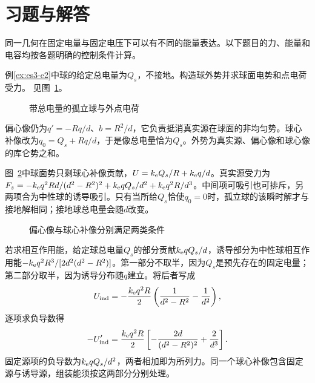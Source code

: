
\section{习题与解答}
同一几何在固定电量与固定电压下可以有不同的能量表达。以下题目的力、能量和电容均按各题明确的控制条件计算。

\begin{exercise}[带总电量的孤立球]\label{ex:es3-h1}
例\ref{ex:es3-e2}中球的给定总电量为$Q_s$，不接地。构造球外势并求球面电势和点电荷受力。 见图~\ref{fig:es3-h1-q}。
\end{exercise}

\begin{figure}[H]\centering
{}
\caption{带总电量的孤立球与外点电荷}\label{fig:es3-h1-q}
\end{figure}
\begin{solution}
偏心像仍为$q'=-Rq/d$、$b=R^2/d$，它负责抵消真实源在球面的非均匀势。球心补像改为$q_0=Q_s+Rq/d$，于是像总电量恰为$Q_s$。外势为真实源、偏心像和球心像的库仑势之和。

图~\ref{fig:es3-h1-s}中球面势只剩球心补像贡献，$U=k_{\rm e} Q_s/R+k_{\rm e} q/d$。真实源受力为$F_z=-k_{\rm e} q^2Rd/(d^2-R^2)^2+k_{\rm e} qQ_s/d^2+k_{\rm e} q^2R/d^3$。中间项可吸引也可排斥，另两项合为中性球的诱导吸引。只有当所给$Q_s$恰使$q_0=0$时，孤立球的该瞬时解才与接地解相同；接地球总电量会随$d$改变。
\begin{figure}[H]\centering
{}
\caption{偏心像与球心补像分别满足两类条件}\label{fig:es3-h1-s}
\end{figure}


若求相互作用能，给定球总电量$Q_s$的部分贡献$k_{\rm e} qQ_s/d$，诱导部分为中性球相互作用能$-k_{\rm e} q^2R^3/[2d^2(d^2-R^2)]$。第一部分不取半，因为$Q_s$是预先存在的固定电量；第二部分取半，因为诱导分布随$q$建立。将后者写成
\[U_{\rm ind}=-\frac{k_{\rm e} q^2R}{2}\left(\frac1{d^2-R^2}-\frac1{d^2}\right),\]
逐项求负导数得
\[-U_{\rm ind}'=\frac{k_{\rm e} q^2R}{2}\left[-\frac{2d}{(d^2-R^2)^2}+\frac2{d^3}\right].\]
固定源项的负导数为$k_{\rm e} qQ_s/d^2$，两者相加即为所列力。同一个球心补像包含固定源与诱导源，组装能须按这两部分分别处理。
\end{solution}

